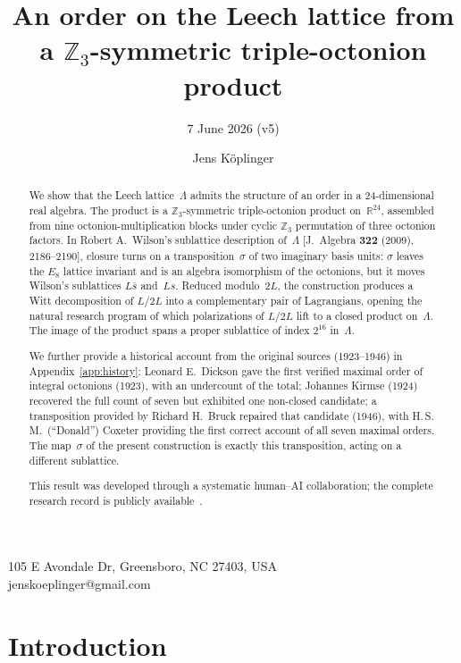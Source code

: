 \documentclass[twoside,english]{paper}
\numberwithin{equation}{section}
\numberwithin{figure}{section}
\newcommand{\lyxaddress}[1]{
	\par {\raggedright #1
	\vspace{1.4em}
	\noindent\par}
}
\theoremstyle{definition}
\theoremstyle{remark}
\newcommand{\RR}{\mathbb{R}}
\newcommand{\ZZ}{\mathbb{Z}}
\newcommand{\LL}{\Lambda}             %
\begin{document}
\title{An order on the Leech lattice from a $\ZZ_3$-symmetric
triple-octonion product}
\subtitle{7 June 2026 (v5)}
\author{Jens K\"oplinger}
\maketitle

\lyxaddress{105 E Avondale Dr, Greensboro, NC 27403, USA \\
jenskoeplinger@gmail.com}

\begin{abstract}
We show that the Leech lattice~$\LL$ admits the structure of an order
in a 24-dimensional real algebra.  The product is a
$\ZZ_3$-symmetric triple-octonion product on~$\RR^{24}$, assembled
from nine octonion-multiplication blocks under cyclic $\ZZ_3$
permutation of three octonion factors.  In Robert A.~Wilson's sublattice
description of~$\LL$ [J.~Algebra \textbf{322} (2009), 2186--2190],
closure turns on a transposition~$\sigma$ of
two imaginary basis units: $\sigma$ leaves the $E_8$ lattice
invariant and is an algebra isomorphism of the octonions, but it
moves Wilson's sublattices $L\bar s$ and~$Ls$.  Reduced modulo~$2L$,
the construction produces a Witt decomposition of $L/2L$ into a
complementary pair of Lagrangians, opening the natural research
program of which polarizations of $L/2L$ lift to a closed product
on~$\LL$.  The image of the product spans a proper sublattice of
index $2^{16}$ in~$\LL$.

We further provide a historical account from the original sources
(1923--1946) in Appendix~\ref{app:history}: Leonard E.~Dickson gave
the first verified maximal order of integral octonions (1923), with
an undercount of the total; Johannes Kirmse (1924) recovered the full
count of seven but exhibited one non-closed candidate; a
transposition provided by Richard H.~Bruck repaired that candidate
(1946), with H.\,S.\,M.~(``Donald'') Coxeter providing the first
correct account of all seven maximal orders.  The map~$\sigma$ of
the present construction is exactly this transposition, acting on a
different sublattice.

This result was developed through a systematic human--AI collaboration;
the complete research record is publicly available~\cite{repo}.
\end{abstract}

\section{Introduction}\label{sec:intro}
\end{document}

